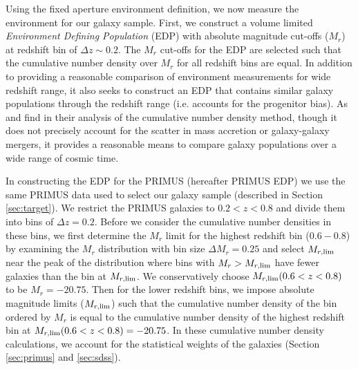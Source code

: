 \documentclass{emulateapj}
\begin{document}
Using the fixed aperture environment definition, we now measure the environment for our galaxy sample. First, we construct a volume limited {\em Environment Defining Population} (EDP) with absolute magnitude cut-offs ($M_{r}$) at redshift bin of $\Delta z \sim 0.2$. The $M_{r}$ cut-offs for the EDP are selected such that the cumulative number density over $M_{r}$ for all redshift bins are equal. In addition to providing a reasonable comparison of environment measurements for wide redshift range, it also seeks to construct an EDP that contains similar galaxy populations through the redshift range (i.e. accounts for the progenitor bias). As \cite{Behroozi:2013aa} and \cite{Leja:2013aa} find in their analysis of the cumulative number density method, though it does not precisely account for the scatter in mass accretion or galaxy-galaxy mergers, it provides a reasonable means to compare galaxy populations over a wide range of cosmic time. 

In constructing the EDP for the PRIMUS (hereafter PRIMUS EDP) we use the same PRIMUS data used to select our galaxy sample (described in Section \ref{sec:target}). We restrict the PRIMUS galaxies to $0.2 < z < 0.8$ and divide them into bins of $\Delta z = 0.2$. Before we consider the cumulative number densities in these bins, we first determine the $M_r$ limit for the highest redshift bin ($0.6-0.8$) by examining the $M_{r}$ distribution with bin size $\Delta M_{r} = 0.25$ and select $M_{r,\rm{lim}}$ near the peak of the distribution where bins with $M_{r} > M_{r,\rm{lim}}$ have fewer galaxies than the bin at $M_{r, \rm{lim}}$. We conservatively choose $M_{r, \rm{lim}}(0.6 < z < 0.8)$ to be $M_{r} = -20.75$. Then for the lower redshift bins, we impose absolute magnitude limits ($M_{r,\rm{lim}}$) such that the cumulative number density of the bin ordered by $M_{r}$ is equal to the cumulative number density of the highest redshift bin at $M_{r, \rm{lim}}(0.6 < z < 0.8) = -20.75$. In these cumulative number density calculations, we account for the statistical weights of the galaxies (Section \ref{sec:primus} and \ref{sec:sdss}).
\end{document}
